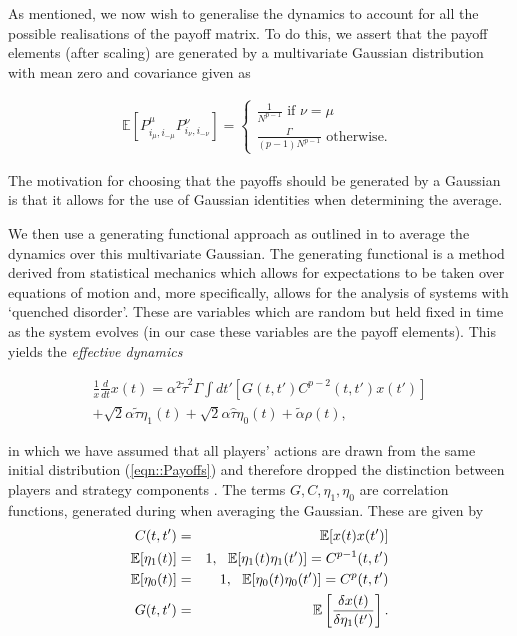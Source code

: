 \documentclass[sigconf,anonymous]{aamas}
\newcommand{\payoff}[2]{P^{#2}_{#1_#2, #1_{-#2}}}
\newcommand{\talpha}{\tilde{\alpha}}
\newcommand{\ttau}{\tilde{\tau}}
\newcommand{\htau}{\hat{\tau}}
\begin{document}
As mentioned, we now wish to generalise the dynamics to account for all the possible realisations of the payoff matrix. To do this, we assert that the payoff elements (after scaling) are generated by a multivariate Gaussian distribution with mean zero and covariance given as

%
\begin{equation}
\label{eqn::Payoffs}
    \begin{split}
        \mathbb{E}\left [ \payoff{i}{\mu} \payoff{i}{\nu} \right] = \begin{cases}
        \frac{1}{N^{p-1}}  \text{ if } \nu = \mu \\
        \frac{\Gamma}{(p-1) N^{p-1}} \text{ otherwise. }
        \end{cases}
    \end{split}
\end{equation}

The motivation for choosing that the payoffs should be generated by a Gaussian is that it allows for the use of Gaussian identities when determining the average.

We then use a generating functional approach as outlined in \cite{Mezard1986} to average the dynamics over this multivariate Gaussian. The generating functional is a method derived from statistical mechanics which allows for expectations to be taken over equations of motion and, more specifically, allows for the analysis of systems with `quenched disorder'. These are variables which are random but held fixed in time as the system evolves (in our case these variables are the payoff elements). This yields the \textit{effective dynamics}

\begin{equation}
    \label{eqn::EffectiveDynamics}
    \begin{split}
            \frac{1}{x} \frac{d}{dt} x(t) = \alpha^2 \ttau^2 \Gamma \int dt' \left [G(t, t')C^{p - 2}(t, t') x(t') \right ]\\ + \sqrt{2} \alpha \ttau \eta_1(t) + \sqrt{2} \alpha \htau \eta_0(t) + \talpha \rho(t), 
    \end{split}
\end{equation}

in which we have assumed that all players' actions are drawn from the same initial distribution (\ref{eqn::Payoffs})
 and therefore dropped the distinction between players and strategy components . The terms $G, C, \eta_1, \eta_0$ are correlation functions, generated during when averaging the Gaussian. These are given by 
\begin{eqnarray*}
        C(t, t') & = & \mathbb{E}[x(t) x(t')] \\
        \mathbb{E}[\eta_1(t)] & = & 1, \text{ \space } \mathbb{E}[\eta_1(t) \eta_1(t')]  =  C^{p-1}(t, t') \\
        \mathbb{E}[\eta_0(t)] & = & 1, \text{ \space } \mathbb{E}[\eta_0(t) \eta_0(t')] = C^{p}(t, t') \\
        G(t, t') & = & \mathbb{E}\left [ \frac{\delta x(t)}{ \delta \eta_1(t')} \right].
\end{eqnarray*}
\end{document}
